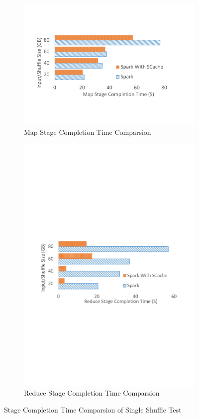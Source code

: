 \begin{figure}
\begin{subfigure}{\linewidth}
	\includegraphics[width=\linewidth]{fig/groupbymapstage}
	\caption{Map Stage Completion Time Comparsion}
	\label{fig:mapstage}
\end{subfigure}
\begin{subfigure}{\linewidth}
	\includegraphics[width=\linewidth]{fig/groupbyreducestage}
	\caption{Reduce Stage Completion Time Comparsion}
	\label{fig:reducestage}
\end{subfigure}
\caption{Stage Completion Time Comparsion of Single Shuffle Test}
\label{fig:singleshuffle}
\end{figure}

